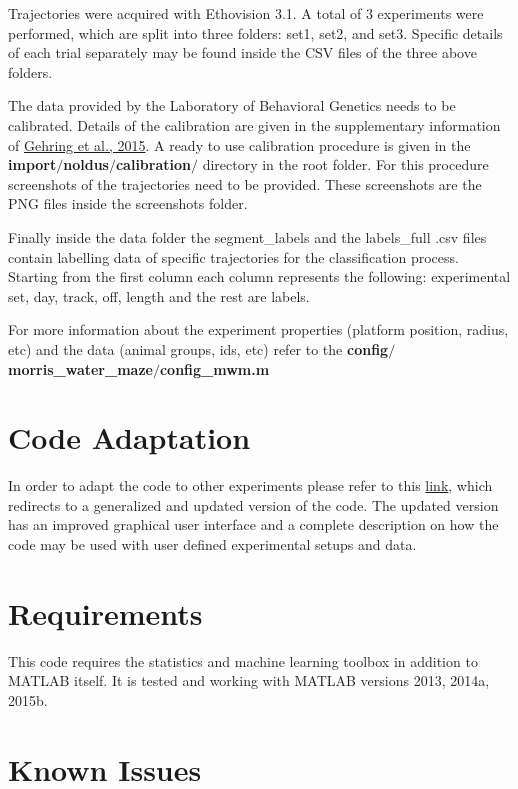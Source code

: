 \documentclass[12pt,titlepage]{article}
\begin{document}
\begin{doublespace}
Trajectories were acquired with Ethovision 3.1. A total of 3 experiments were performed, which are split into three folders: set1, set2, and set3. Specific details of each trial separately may be found inside the CSV files of the three above folders.

The data provided by the Laboratory of Behavioral Genetics needs to be calibrated. Details of the calibration are given in the supplementary information of \href{http://www.nature.com/articles/srep14562}{Gehring et al., 2015}. A ready to use calibration procedure is given in the \textbf{import$/$noldus$/$calibration$/$} directory in the root folder.  For this procedure screenshots of the trajectories need to be provided. These screenshots are the PNG files inside the screenshots folder.

Finally inside the data folder the segment\_labels and the labels\_full .csv files contain labelling data of specific trajectories for the classification process. Starting from the first column each column represents the following: experimental set, day, track, off, length and the rest are labels.

For more information about the experiment properties (platform position, radius, etc) and the data (animal groups, ids, etc) refer to the \textbf{config$/$morris\_water\_maze$/$config\_mwm.m}


\section{Code Adaptation}

In order to adapt the code to other experiments please refer to this \href{https://github.com/RodentDataAnalytics/roda}{link}, which redirects to a generalized and updated version of the code. The updated version has an improved graphical user interface and a complete description on how the code may be used with user defined experimental setups and data.


\section{Requirements}

This code requires the statistics and machine learning toolbox in addition to MATLAB itself.
It is tested and working with MATLAB versions 2013, 2014a, 2015b.


\section{Known Issues}


\end{doublespace}
\end{document}
